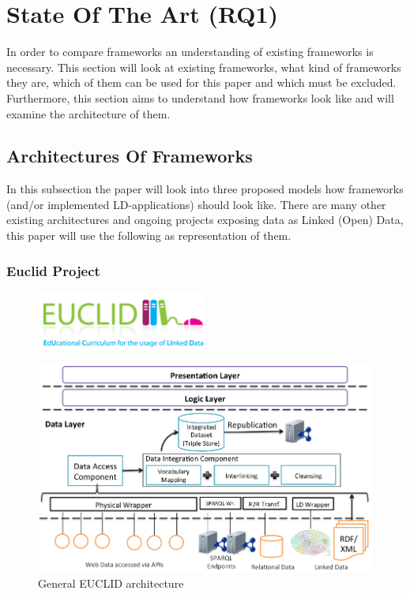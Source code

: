 \chapter{State Of The Art (RQ1)}
In order to compare frameworks an understanding of existing frameworks is necessary. This section will look at existing frameworks, what kind of frameworks they are, which of them can be used for this paper and which must be excluded. Furthermore, this section aims to understand how frameworks look like and will examine the architecture of them.

\section{Architectures Of Frameworks}
In this subsection the paper will look into three proposed models how frameworks (and/or implemented LD-applications) should look like. There are many other existing architectures and ongoing projects exposing data as Linked (Open) Data, this paper will use the following as representation of them.

\subsection{Euclid Project}

\begin{figure}[h]
	\centering
\includegraphics[width=0.5\textwidth]{img/euclid_logo.png}
\end{figure}

\begin{figure}[ht]
	\centering
\includegraphics[width=1\textwidth]{img/euclid_architecture.png}
	\caption{General EUCLID architecture}
	\label{euclid_architecture}
\end{figure}

